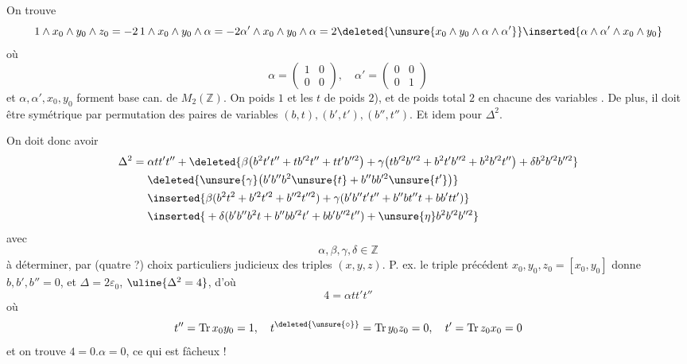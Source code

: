 On trouve
\[
1\wedge x_0\wedge y_0\wedge z_0=-2\,1\wedge x_0\wedge y_0\wedge\alpha
=-2\alpha'\wedge x_0\wedge y_0\wedge\alpha
=2\deleted{\unsure{x_0\wedge y_0\wedge\alpha\wedge\alpha'}}\inserted{\alpha\wedge\alpha'\wedge x_0\wedge y_0}
\]
où
\[
\alpha=\begin{pmatrix}1&0\\0&0\end{pmatrix},\quad\alpha'=\begin{pmatrix}0&0\\0&1\end{pmatrix}
\]
et  $\alpha,\alpha',x_0,y_0$ forment base can. de $M_2(\mathbb{Z})$. On
poids $1$ et les $t$ de poids $2$), et de poids total $2$ en chacune des  variables  .
De plus, il doit être symétrique par permutation des   paires de variables $(b,t),(b',t'),(b'',t'')$. Et idem pour $\Delta^2$.

On doit donc avoir
\[
\begin{aligned}
\Delta^2={}&\alpha tt't''+\deleted{\beta\bigl(b^2t't''+tb'^2t''+tt'b''^2\bigr)+\gamma\bigl(tb'^2b''^2+b^2t'b''^2+b^2b'^2t''\bigr)+\delta b^2b'^2b''^2}\\
&\deleted{\unsure{\gamma}\bigl(b'b''b^2\unsure{t}+b''bb'^2\unsure{t'}\bigr)}\\
&\inserted{\beta(b^2t^2+b'^2t'^2+b''^2t''^2)+\gamma(b'b''t't''+b''bt''t+bb'tt')}\\
&\inserted{{}+\delta(b'b''b^2t+b''bb'^2t'+bb'b''^2t'')+\unsure{\eta}b^2b'^2b''^2}
\end{aligned}
\]
avec
\[
\alpha,\beta,\gamma,\delta\in\mathbb{Z}
\]
à déterminer, par (quatre ?) choix particuliers judicieux des triples $(x,y,z)$. P. ex. le triple précédent $x_0,y_0,z_0=[x_0,y_0]$ donne $b,b',b''=0$, et $\Delta=2\varepsilon_0$, $\uline{\Delta^2=4}$, d'où
\[
4=\alpha tt't''
\]
où
\[
t''=\operatorname{Tr}x_0y_0=1,\quad t^{\deleted{\unsure{\circ}}}=\operatorname{Tr}y_0z_0=0,\quad t'=\operatorname{Tr}z_0x_0=0
\]
et on trouve $4=0.\alpha=0$, ce qui est fâcheux !

